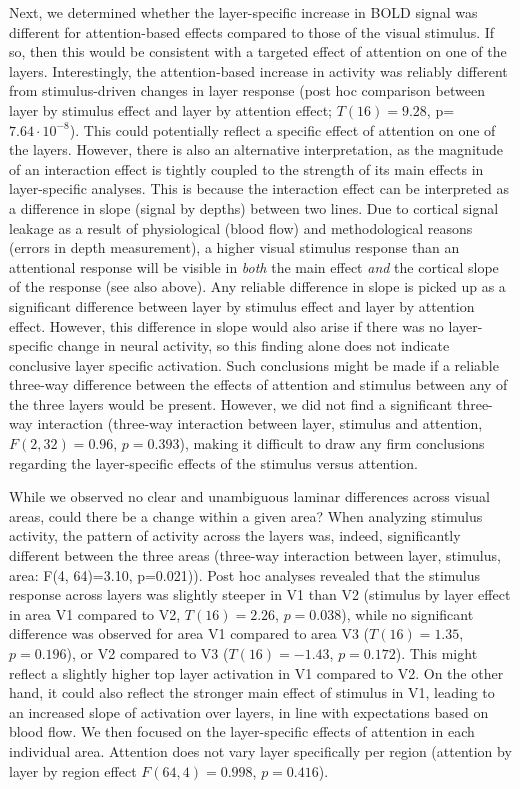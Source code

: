 \documentclass[9pt,lineno]{aperture}
\begin{document}
Next, we determined whether the layer-specific increase in BOLD signal was different for attention-based effects compared to those of the visual stimulus. If so, then this would be consistent with a targeted effect of attention on one of the layers. Interestingly, the attention-based increase in activity was reliably different from stimulus-driven changes in layer response (post hoc comparison between layer by stimulus effect and layer by attention effect; $T(16)=9.28$, p=$7.64\cdot10^{-8}$). This could potentially reflect a specific effect of attention on one of the layers. However, there is also an alternative interpretation, as the magnitude of an interaction effect is tightly coupled to the strength of its main effects in layer-specific analyses. 
This is because the interaction effect can be interpreted as a difference in slope (signal by depths) between two lines. Due to cortical signal leakage as a result of physiological (blood flow) and methodological reasons (errors in depth measurement), a higher visual stimulus response than an attentional response will be visible in \emph{both} the main effect \emph{and} the cortical slope of the response (see also above). Any reliable difference in slope is picked up as a significant difference between layer by stimulus effect and layer by attention effect. However, this difference in slope would also arise if there was no layer-specific change in neural activity, so this finding alone does not indicate conclusive layer specific activation. Such conclusions might be made if a reliable three-way difference between the effects of attention and stimulus between any of the three layers would be present. However, we did not find a significant three-way interaction (three-way interaction between layer, stimulus and attention, $F(2,32)=0.96$, $p=0.393$), making it difficult to draw any firm conclusions regarding the layer-specific effects of the stimulus versus attention.

While we observed no clear and unambiguous laminar differences across visual areas, could there be a change within a given area? When analyzing stimulus activity, the pattern of activity across the layers was, indeed, significantly different between the three areas (three-way interaction between layer, stimulus, area: F(4, 64)=3.10, p=0.021)). Post hoc analyses revealed that the stimulus response across layers was slightly steeper in V1 than V2 (stimulus by layer effect in area V1 compared to V2, $T(16)=2.26$, $p=0.038$), while no significant difference was observed for area V1 compared to area V3 ($T(16)=1.35$, $p=0.196$), or V2 compared to V3 ($T(16)=-1.43$, $p=0.172$). This might reflect a slightly higher top layer activation in V1 compared to V2. On the other hand, it could also reflect the stronger main effect of stimulus in V1, leading to an increased slope of activation over layers, in line with expectations based on blood flow. We then focused on the layer-specific effects of attention in each individual area.
Attention does not vary layer specifically per region (attention by layer by region effect $F(64,4)=0.998$, $p=0.416$).
\end{document}
